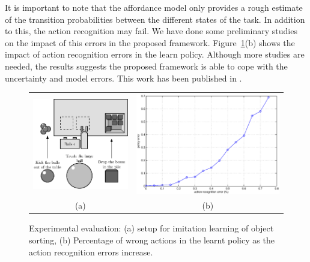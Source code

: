 It is important to note that the affordance model only provides a
rough estimate of the transition probabilities between the different
states of the task. In addition to this, the action recognition may
fail. We have done some preliminary studies on the impact of this
errors in the proposed
framework. Figure~\ref{fig:manipulation:experim}(b) shows the impact
of action recognition errors in the learn policy. Although more
studies are needed, the results suggests the proposed framework is
able to cope with the uncertainty and model errors.
%
This work has been published in \cite{montesano:etal:2007}.
\begin{figure}
\begin{tabular}{cc}
\includegraphics[width=0.45\columnwidth]{images/Recycler.eps} &
\includegraphics[width=0.45\columnwidth]{images/error.eps} \\
(a) & (b) \\
\end{tabular}
\caption{Experimental evaluation: (a) setup for imitation learning of
  object sorting, (b) Percentage of wrong actions in the learnt policy
  as the action recognition errors increase.}
\label{fig:manipulation:experim}
\end{figure}

\endinput
